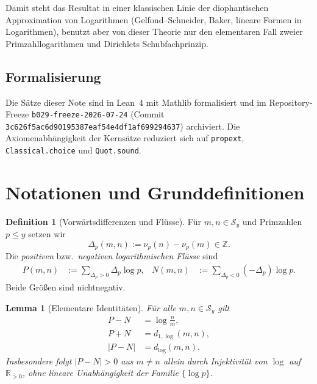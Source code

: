 \documentclass[11pt,a4paper]{article}
\newtheorem{lemma}[theorem]{Lemma}
\theoremstyle{definition}
\newtheorem{definition}[theorem]{Definition}
\newcommand{\Z}{\mathbb{Z}}
\newcommand{\R}{\mathbb{R}}
\newcommand{\Sy}{\mathcal{S}_y}
\newcommand{\nuP}{\nu}
\newcommand{\dlog}{d_{\log}}
\newcommand{\dlogone}{d_{1,\log}}
\begin{document}
	Damit steht das Resultat in einer klassischen Linie der
	diophantischen Approximation von Logarithmen
	(Gelfond--Schneider, Baker, lineare Formen in Logarithmen),
	benutzt aber von dieser Theorie nur den elementaren Fall zweier
	Primzahllogarithmen und Dirichlets Schubfachprinzip.
	
	\subsection{Formalisierung}
	
	Die S{\"a}tze dieser Note sind in Lean~4 mit Mathlib formalisiert und im
	Repository-Freeze
	\texttt{b029-freeze-2026-07-24}
	(Commit \texttt{3c626f5ac6d90195387eaf54e4df1af699294637})
	archiviert. Die Axiomenabh{\"a}ngigkeit der Kerns{\"a}tze reduziert sich auf
	\texttt{propext}, \texttt{Classical.choice} und \texttt{Quot.sound}.
	
	\section{Notationen und Grunddefinitionen}
	\label{sec:defs}
	
	\begin{definition}[Vorw{\"a}rtsdifferenzen und Fl{\"u}sse]
		\label{def:flows}
		F{\"u}r $m,n\in\Sy$ und Primzahlen $p\le y$ setzen wir
		\[
		\Delta_p(m,n)
		:=
		\nuP_p(n)-\nuP_p(m)\in\Z.
		\]
		Die \emph{positiven} bzw.\ \emph{negativen logarithmischen Fl{\"u}sse} sind
		\begin{align*}
			P(m,n)
			&:=
			\sum_{\Delta_p>0}\Delta_p\log p,
			&
			N(m,n)
			&:=
			\sum_{\Delta_p<0}(-\Delta_p)\log p.
		\end{align*}
		Beide Gr{\"o}{\ss}en sind nichtnegativ.
	\end{definition}
	
	\begin{lemma}[Elementare Identit{\"a}ten]
		\label{lem:PN-ids}
		F{\"u}r alle $m,n\in\Sy$ gilt
		\begin{align}
			\label{eq:P-N}
			P-N
			&=
			\log\frac{n}{m},
			\\
			\label{eq:P+N}
			P+N
			&=
			\dlogone(m,n),
			\\
			\label{eq:absPN}
			\lvert P-N\rvert
			&=
			\dlog(m,n).
		\end{align}
		Insbesondere folgt $\lvert P-N\rvert>0$ aus $m\neq n$ allein durch
		Injektivit{\"a}t von $\log$ auf $\R_{>0}$, ohne lineare Unabh{\"a}ngigkeit
		der Familie $\{\log p\}$.
	\end{lemma}
	
\end{document}
